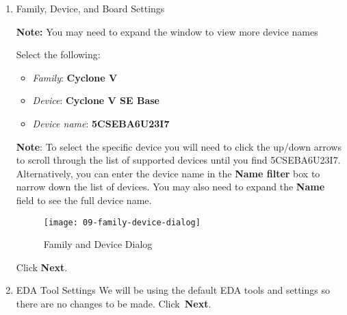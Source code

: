 \begin{flushleft}
\begin{enumerate}[
	label=\textbf{Step \arabic*.},
	leftmargin=*,
	widest={00},
	align=left]
\begin{enumerate}[
	label=\textbf{Step \arabic{enumi}\alph*.},
	leftmargin=*,
	align=left]
\begin{figure}[H]
\centering
\texttt{[image: 08-add-files-dialog]}
\caption{Add Files Dialog}
\label{fig:08-add-files-dialog}
\end{figure}

\newpage

\item Family, Device, and Board Settings

\begin{tcolorbox}[
	colback=MyMintedBGColor,
	colframe=MyMintedBGColor,
	]
\textbf{Note:} You may need to expand the window to view more device names
\end{tcolorbox}

Select the following:

\begin{itemize}
\item \emph{Family}: \textbf{Cyclone V}
\item \emph{Device}: \textbf{Cyclone V SE Base}
\item \emph{Device name}: \textbf{5CSEBA6U23I7}
\end{itemize}

\begin{tcolorbox}[
	colback=MyMintedBGColor,
	colframe=MyMintedBGColor,
	]
\textbf{Note}: To select the specific device you will need to click the up/down arrows to scroll through the list of supported devices until you find 5CSEBA6U23I7. Alternatively, you can enter the device name in the \textbf{Name filter} box to narrow down the list of devices. You may also need to expand the \textbf{Name} field to see the full device name.
\end{tcolorbox}

\begin{figure}[H]
\centering
\texttt{[image: 09-family-device-dialog]}
\caption{Family and Device Dialog}
\label{fig:09-family-device-dialog}
\end{figure}

Click \textbf{Next}.
\newline

\newpage

\item EDA Tool Settings
\newline
\newline
We will be using the default EDA tools and settings so there are no changes to be made. Click~\textbf{Next}.


\end{enumerate}
\end{enumerate}
\end{flushleft}
